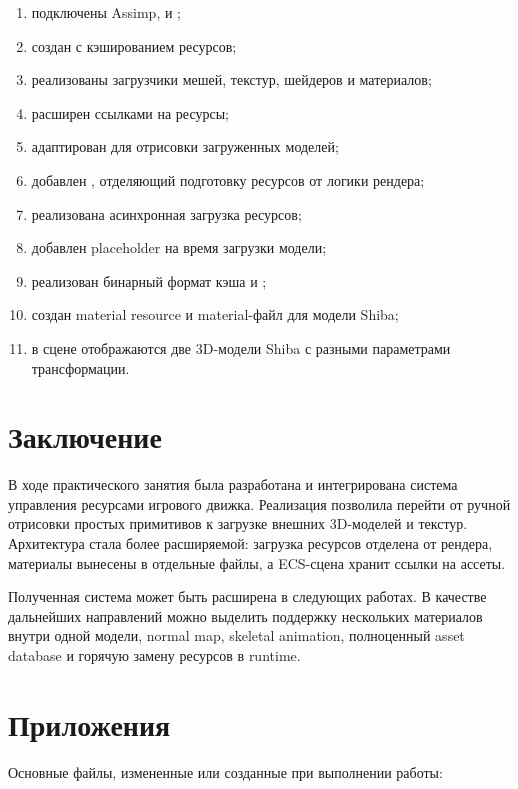 \documentclass[14pt,a4paper]{extarticle}
\begin{document}
\begin{enumerate}
  \item подключены Assimp,  и ;
  \item создан  с кэшированием ресурсов;
  \item реализованы загрузчики мешей, текстур, шейдеров и материалов;
  \item {} расширен ссылками на ресурсы;
  \item {} адаптирован для отрисовки загруженных моделей;
  \item добавлен , отделяющий подготовку ресурсов от логики рендера;
  \item реализована асинхронная загрузка ресурсов;
  \item добавлен placeholder на время загрузки модели;
  \item реализован бинарный формат кэша  и ;
  \item создан material resource и material-файл для модели Shiba;
  \item в сцене отображаются две 3D-модели Shiba с разными параметрами трансформации.
\end{enumerate}


\section{Заключение}

В ходе практического занятия была разработана и интегрирована система управления ресурсами игрового движка.
Реализация позволила перейти от ручной отрисовки простых примитивов к загрузке внешних 3D-моделей и текстур.
Архитектура стала более расширяемой: загрузка ресурсов отделена от рендера, материалы вынесены в отдельные
файлы, а ECS-сцена хранит ссылки на ассеты.

Полученная система может быть расширена в следующих работах. В качестве дальнейших направлений можно
выделить поддержку нескольких материалов внутри одной модели, normal map, skeletal animation, полноценный
asset database и горячую замену ресурсов в runtime.

\section{Приложения}

Основные файлы, измененные или созданные при выполнении работы:
\end{document}

